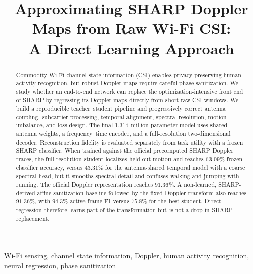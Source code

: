 \documentclass[10pt,conference,letterpaper]{IEEEtran}
\title{Approximating SHARP Doppler Maps from Raw Wi-Fi CSI:\\
A Direct Learning Approach}
\author{
\IEEEauthorblockN{Gianmaria Frigo 2196376, Mattia Pinton 2198302}
\IEEEauthorblockA{Department of Information Engineering\\
University of Padova, Italy}
}
\begin{document}
\maketitle

\begin{abstract}
Commodity Wi-Fi channel state information (CSI) enables privacy-preserving human activity recognition, but robust Doppler maps require careful phase sanitization.
We study whether an end-to-end network can replace the optimization-intensive front end of SHARP by regressing its Doppler maps directly from short raw-CSI windows.
We build a reproducible teacher--student pipeline and progressively correct antenna coupling, subcarrier processing, temporal alignment, spectral resolution, motion imbalance, and loss design.
The final 1.314-million-parameter model uses shared antenna weights, a frequency--time encoder, and a full-resolution two-dimensional decoder.
Reconstruction fidelity is evaluated separately from task utility with a frozen SHARP classifier.
When trained against the official precomputed SHARP Doppler traces, the full-resolution
student localizes held-out motion and reaches \(63.09\%\) frozen-classifier
accuracy, versus \(43.31\%\) for the antenna-shared temporal model with a coarse
spectral head, but it smooths spectral detail and confuses walking and jumping with running. The
official Doppler representation reaches \(91.36\%\). A non-learned,
SHARP-derived affine sanitization baseline followed by the fixed Doppler
transform also reaches \(91.36\%\), with \(94.3\%\)
active-frame F1 versus \(75.8\%\) for the best student. Direct regression
therefore learns part of the transformation but is not a drop-in SHARP
replacement.
\end{abstract}

\begin{IEEEkeywords}
Wi-Fi sensing, channel state information, Doppler, human activity recognition,
neural regression, phase sanitization
\end{IEEEkeywords}









\end{document}

